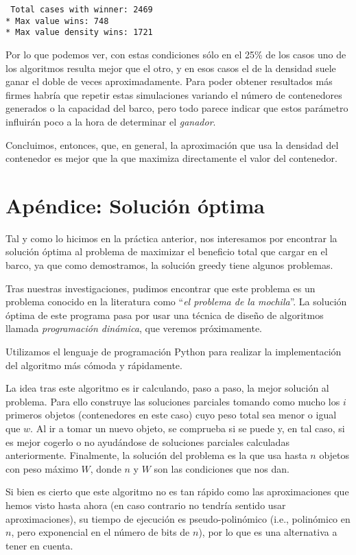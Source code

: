 \documentclass[a4paper, 11pt]{article}
\begin{document}
\texttt{
Total cases with winner: 2469\\*
Max value wins:          748\\*
Max value density wins: 1721
}

Por lo que podemos ver, con estas condiciones sólo en el 25\% de los casos uno de los algoritmos resulta mejor que el otro, y en esos casos el de la densidad suele ganar el doble de veces aproximadamente. Para poder obtener resultados más firmes habría que repetir estas simulaciones variando el número de contenedores generados o la capacidad del barco, pero todo parece indicar que estos parámetro influirán poco a la hora de determinar el \textit{ganador}.

Concluimos, entonces, que, en general, la aproximación que usa la densidad del contenedor es mejor que la que maximiza directamente el valor del contenedor.

\section{Apéndice: Solución óptima}
Tal y como lo hicimos en la práctica anterior, nos interesamos por encontrar la solución óptima al problema de maximizar el beneficio total que cargar en el barco, ya que como demostramos, la solución greedy tiene algunos problemas.

Tras nuestras investigaciones, pudimos encontrar que este problema es un problema conocido en la literatura como ``\textit{el problema de la mochila}''. La solución óptima de este programa pasa por usar una técnica de diseño de algoritmos llamada \textit{programación dinámica}, que veremos próximamente.

Utilizamos el lenguaje de programación Python para realizar la implementación del algoritmo más cómoda y rápidamente.

La idea tras este algoritmo es ir calculando, paso a paso, la mejor solución al problema. Para ello construye las soluciones parciales tomando como mucho los $i$ primeros objetos (contenedores en este caso) cuyo peso total sea menor o igual que $w$. Al ir a tomar un nuevo objeto, se comprueba si se puede y, en tal caso, si es mejor cogerlo o no ayudándose de soluciones parciales calculadas anteriormente. Finalmente, la solución del problema es la que usa hasta $n$ objetos con peso máximo $W$, donde $n$ y $W$ son las condiciones que nos dan.

Si bien es cierto que este algoritmo no es tan rápido como las aproximaciones que hemos visto hasta ahora (en caso contrario no tendría sentido usar aproximaciones), su tiempo de ejecución es pseudo-polinómico (i.e., polinómico en $n$, pero exponencial en el número de bits de $n$), por lo que es una alternativa a tener en cuenta.
\end{document}
